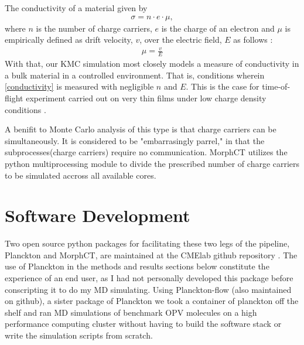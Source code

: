 The conductivity of a material given by 
\begin{align}
    \label{conductivity}
    \sigma = n \cdot e \cdot \mu,
\end{align}
where $n$ is the number of charge carriers, $e$ is the charge of an electron and $\mu$ is empirically
defined as drift velocity, $v$, over the electric field, $E$ as follows \cite{Kokil2012}:
\begin{align}
    \label{m}
    \mu = \frac{v}{E}
\end{align}
With that, our KMC simulation most closely models a measure of conductivity in a bulk material in a controlled
environment. That is, conditions wherein \autoref{conductivity} is measured with negligible $n$ and $E$.
This is the case for time-of-flight experiment carried out on very thin films under low charge density
conditions \cite{Chen2000a}.

A benifit to Monte Carlo analysis of this type is that charge carriers can be simultaneously. It is considered
to be "embarrasingly parrel," in that the subprocesses(charge carriers) require no communication.
MorphCT utilizes the python multiprocessing module to divide the prescribed number of charge carriers to be
simulated accross all available cores.

\section{Software Development}
\label{software-methods}


Two open source python packages for
facilitating these two legs of the pipeline, Planckton and MorphCT, are maintained at 
the CMElab github repository \cite{cmelab}.
The use of Planckton in the methods and results sections below
constitute the experience of an end user, as I had not personally developed this package before conscripting it
to do my MD simulating. 
Using Planckton-flow (also maintained on github), a sister package
of Planckton we took a container of planckton off the shelf and ran MD simulations of benchmark OPV
molecules on a high performance computing cluster without having to build the software stack or write the
simulation scripts from scratch. 

